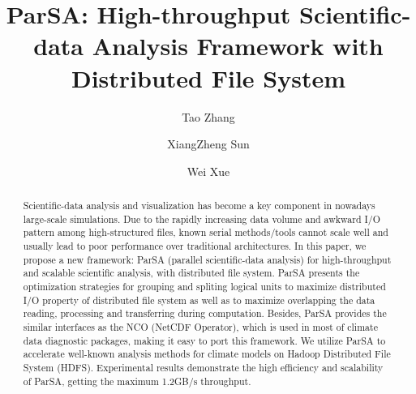 \documentclass[preprint,12pt]{elsarticle}
\begin{document}
\begin{frontmatter}



\title{ParSA: High-throughput Scientific-data Analysis Framework with Distributed File System}



\author[1]{Tao Zhang}
\author[2]{XiangZheng Sun}
\author[1]{Wei Xue}
\address[1]{Department of Computer Science and Technology, Tsinghua University, Beijing, China}
\address[2]{Intel Corporation, Beijing, China}

\begin{abstract}
Scientific-data analysis and visualization has become a key component in nowadays large-scale simulations. Due to the rapidly
increasing data volume and awkward I/O pattern among high-structured files, known serial methods/tools cannot scale well and 
usually lead to poor performance over traditional architectures. In this paper, we propose a new framework: ParSA 
(parallel scientific-data analysis) for high-throughput and scalable scientific analysis, with distributed file system. ParSA
presents the optimization strategies for grouping and spliting logical units to maximize distributed I/O property of distributed 
file system as well as to maximize overlapping the data reading, processing and transferring during computation. Besides, ParSA 
provides the similar interfaces as the NCO (NetCDF Operator), which is used in most of climate data diagnostic packages, making
it easy to port this framework. We utilize ParSA to accelerate well-known analysis methods for climate models on Hadoop Distributed File 
System (HDFS). Experimental results demonstrate the high efficiency and scalability of ParSA, getting the maximum 1.2GB/s throughput.
\end{abstract}


\end{frontmatter}
\end{document}
